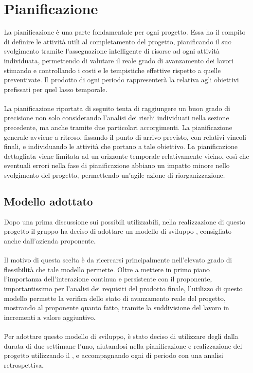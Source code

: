 \chapter{Pianificazione}\label{chap:pianificazione}
La pianificazione è una parte fondamentale per ogni progetto. Essa ha il compito di definire le attività utili al completamento del progetto, pianificando il suo svolgimento tramite l'assegnazione intelligente di risorse ad ogni attività individuata, permettendo di valutare il reale grado di avanzamento dei lavori stimando e controllando i costi e le tempistiche effettive rispetto a quelle preventivate. Il prodotto di ogni periodo rappresenterà la  relativa agli obiettivi prefissati per quel lasso temporale.\\ \\
La pianificazione riportata di seguito tenta di raggiungere un buon grado di precisione non solo considerando l'analisi dei rischi individuati nella sezione precedente, ma anche tramite due particolari accorgimenti. La pianificazione generale avviene a ritroso, fissando il punto di arrivo previsto, con relativi vincoli finali, e individuando le attività che portano a tale obiettivo. La pianificazione dettagliata viene limitata ad un orizzonte temporale relativamente vicino, così che eventuali errori nella fase di pianificazione abbiano un impatto minore nello svolgimento del progetto, permettendo un'agile azione di riorganizzazione. 

\section{Modello adottato}
Dopo una prima discussione sui possibili  utilizzabili, nella realizzazione di questo progetto il gruppo ha deciso di adottare un modello di sviluppo , consigliato anche dall'azienda proponente.\\ \\
Il motivo di questa scelta è da ricercarsi principalmente nell'elevato grado di flessibilità che tale modello permette. Oltre a mettere in primo piano l'importanza dell'interazione continua e persistente con il proponente, importantissimo per l'analisi dei requisiti del prodotto finale, l'utilizzo di questo modello permette la verifica dello stato di avanzamento reale del progetto, mostrando al proponente quanto fatto, tramite la suddivisione del lavoro in incrementi a valore aggiuntivo.\\ \\
Per adottare questo modello di sviluppo, è stato deciso di utilizzare degli  dalla durata di due settimane l'uno, aiutandosi nella pianificazione e realizzazione del progetto utilizzando il  , e accompagnando ogni  di periodo con una analisi retrospettiva.

